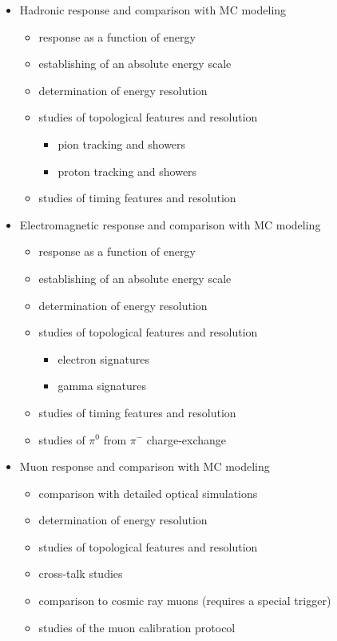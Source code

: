 \documentclass[12pt,a4paper]{article}
\begin{document}
\begin{itemize}
\item Hadronic response and comparison with MC modeling
\begin{itemize}
\item response as a function of energy
\item establishing of an absolute energy scale
\item determination of energy resolution
\item studies of topological features and resolution
\begin{itemize}
\item pion tracking and showers
\item proton tracking and showers
\end{itemize}
\item studies of timing features and resolution
\end{itemize}
\item Electromagnetic response and comparison with MC modeling
\begin{itemize}
\item response as a function of energy
\item establishing of an absolute energy scale
\item determination of energy resolution
\item studies of topological features and resolution
\begin{itemize}
\item electron signatures
\item gamma signatures
\end{itemize}
\item studies of timing features and resolution
\item studies of $\pi^0$ from $\pi^-$ charge-exchange
\end{itemize}
\item Muon response and comparison with MC modeling
\begin{itemize}
\item comparison with detailed optical simulations
\item determination of energy resolution
\item studies of topological features and resolution
\item cross-talk studies
\item comparison to cosmic ray muons (requires a special trigger)
\item studies of the muon calibration protocol
\end{itemize}

\end{itemize}
\end{document}

